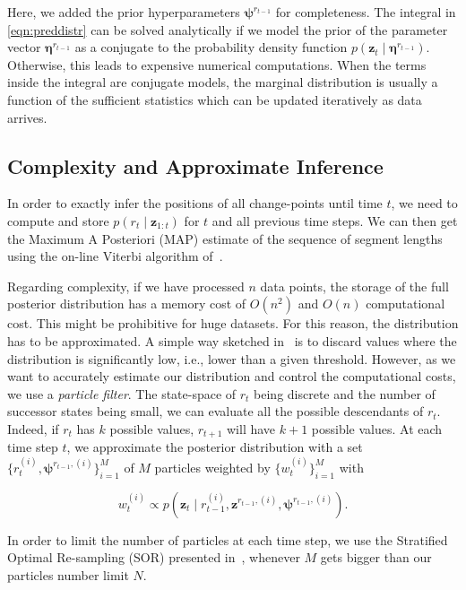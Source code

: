 Here, we added the prior hyperparameters $\boldsymbol{\psi}^{r_{t-1}}$ for
completeness. The integral in \eqref{eqn:preddistr} can be solved analytically
if we model the prior of the parameter vector $\boldsymbol{\eta}^{r_{t-1}}$ as a
conjugate to the probability density function $p(\mathbf{z}_t\mid
\boldsymbol{\eta}^{r_{t-1}})$. Otherwise, this leads to expensive numerical
computations. When the terms inside the integral are conjugate models, the
marginal distribution is usually a function of the sufficient statistics which
can be updated iteratively as data arrives.

\subsection{Complexity and Approximate Inference}
In order to exactly infer the positions of all change-points until time $t$, we
need to compute and store $p(r_t\mid \mathbf{z}_{1:t})$ for $t$ and all previous
time steps. We can then get the Maximum A Posteriori (MAP) estimate of the
sequence of segment lengths using the on-line Viterbi
algorithm of~\cite{fearnhead07online}.

Regarding complexity, if we have processed $n$ data points, the storage of the
full posterior distribution has a memory cost of $O(n^2)$ and $O(n)$
computational cost. This might be prohibitive for huge datasets. For this
reason, the distribution has to be approximated. A simple way sketched
in~\cite{adams07bayesian} is to discard values where the distribution is
significantly low, i.e., lower than a given threshold. However, as we want to
accurately estimate our distribution and control the computational costs, we use
a \emph{particle filter}. The state-space of $r_t$ being discrete and the number
of successor states being small, we can evaluate all the possible descendants of
$r_t$. Indeed, if $r_t$ has $k$ possible values, $r_{t+1}$ will have $k+1$
possible values. At each time step $t$, we approximate the posterior
distribution with a set $\{r_t^{(i)},\boldsymbol{\psi}^{r_{t-1},(i)}\}_{i=1}^M$ of
$M$ particles weighted by $\{w_t^{(i)}\}_{i=1}^M$ with

\begin{equation}
\label{eqn:weight}
w_t^{(i)} \propto p(\mathbf{z}_t\mid r_{t-1}^{(i)},\mathbf{z}^{r_{t-1},(i)},
\boldsymbol{\psi}^{r_{t-1},(i)}).
\end{equation}

In order to limit the number of particles at each time step, we use the
Stratified Optimal Re-sampling (SOR) presented in~\cite{fearnhead07online},
whenever $M$ gets bigger than our particles number limit $N$.


